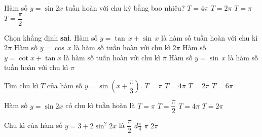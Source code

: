\begin{ex}%
	Hàm số $y=\sin 2x$ tuần hoàn với chu kỳ bằng  bao nhiêu?
	 \choice
		 {$T=4\pi $}
		{$T=2\pi  $}
		{\True $T=\pi $} 
		 {$T=\dfrac{\pi }{2}$}
\end{ex}

\begin{ex}%
	Chọn khẳng định  \textbf{sai}.
	\choice 
		 {Hàm số $y=\tan \,x+\sin \,x$ là hàm số tuần hoàn với chu kì $2\pi $}
		{Hàm số $y=\cos  \,x$ là hàm số tuần hoàn với chu kì $2\pi $}
		{Hàm số $y=\cot x+\tan x$  là hàm số tuần hoàn với chu kì $\pi $}
		{\True Hàm số  $y=\sin \,x$ là hàm số tuần hoàn với chu kì $\pi $}
\end{ex}

\begin{ex}%
	Tìm chu kì $T$ của  hàm số $y=\sin\left(x+\dfrac{\pi}{3}\right)$.
	\choice 
		{$T=\pi$} 
		{$T=4\pi$} 
		{\True $T=2\pi$} 
		 {$T=6\pi$}
\end{ex}

\begin{ex}%
	 Hàm số $y = \sin 2x$ có chu kì tuần hoàn là
	 \choice
		 {\True $T = \pi$}
		{$T  = \dfrac{\pi}{2}$}
		 {$T = 4\pi$}
		{$T  = 2\pi$}
\end{ex}

\begin{ex}%
	Chu kì của  hàm số $y = 3 + 2\sin^2 2x$ là
	\choice 
		 {\True $\dfrac{\pi}{2}$}
		{$d\frac{\pi}{4}$} 
		 {$\pi$}
		 {$2\pi$}
\end{ex}

